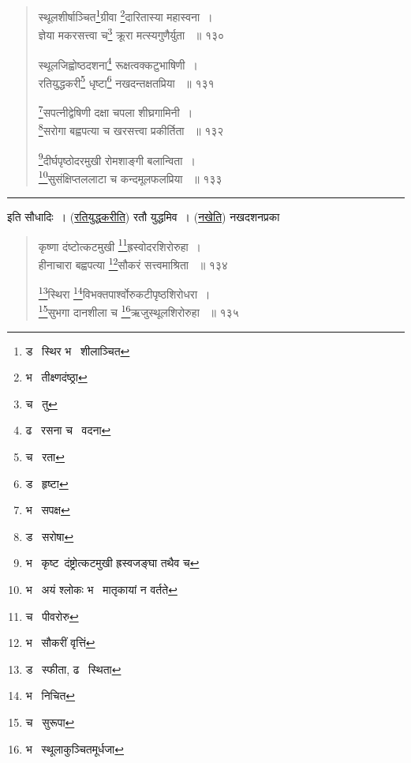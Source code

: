 \documentclass[11pt, openany]{book}
\begin{document}
{\begin{quote}
{स्थूलशीर्षाञ्चित\renewcommand{\thefootnote}{8}\footnote{ड \textendash\ स्थिर भ \textendash\ शीलाञ्चित }ग्रीवा \renewcommand{\thefootnote}{9}\footnote{भ \textendash\ तीक्ष्णदंष्ठ्रा}दारितास्या महास्वना~। \\
ज्ञेया मकरसत्त्वा च\renewcommand{\thefootnote}{10}\footnote{च \textendash\ तु } क्रूरा मत्स्यगुणैर्युता ~॥ १३० 

स्थूलजिह्वोष्ठदशना\renewcommand{\thefootnote}{11}\footnote{ढ \textendash\ रसना च \textendash\ वदना } रूक्षत्वक्कटुभाषिणी~।\\ 
रतियुद्धकरी\renewcommand{\thefootnote}{12}\footnote{च \textendash\ रता } धृष्टा\renewcommand{\thefootnote}{13}\footnote{ड \textendash\ हृष्टा} नखदन्तक्षतप्रिया ~॥ १३१ 

\renewcommand{\thefootnote}{14}\footnote{भ \textendash\ सपक्ष}सपत्नीद्वेषिणी दक्षा चपला शीघ्रगामिनी~।\\ 
\renewcommand{\thefootnote}{15}\footnote{ड \textendash\ सरोषा }सरोगा बह्वपत्या च खरसत्त्वा प्रकीर्तिता ~॥ १३२ 

\renewcommand{\thefootnote}{16}\footnote{भ \textendash\ कृष्ट\textendash\ दंष्ट्रोत्कटमुखी ह्रस्वजङ्घा तथैव च}दीर्घपृष्ठोदरमुखी रोमशाङ्गी बलान्विता~। \\
\renewcommand{\thefootnote}{17}\footnote{भ \textendash\ अयं श्लोकः भ \textendash\ मातृकायां न वर्तते }सुसंक्षिप्तललाटा च कन्दमूलफलप्रिया ~॥ १३३ }
\end{quote}

\hrule

\vspace{2mm}

\noindent
इति सौधादिः~। (\underline{रतियुद्धकरीति}) रतौ युद्धमिव~। (\underline{नखेति}) नखदशनप्रका\textendash\ 

\newpage

\begin{quote}
 {\na कृष्णा दंष्टोत्कटमुखी \renewcommand{\thefootnote}{1}\footnote{च \textendash\ पीवरोरु}ह्रस्वोदरशिरोरुहा~। \\
हीनाचारा बह्वपत्या \renewcommand{\thefootnote}{2}\footnote{भ \textendash\ सौकरीं वृत्तिं}सौकरं सत्त्वमाश्रिता ~॥ १३४ 

\renewcommand{\thefootnote}{3}\footnote{ड \textendash\ स्फीता, ढ \textendash\ स्थिता}स्थिरा \renewcommand{\thefootnote}{4}\footnote{भ \textendash\ निचित }विभक्तपार्श्वोरुकटीपृष्ठशिरोधरा~।\\ 
\renewcommand{\thefootnote}{5}\footnote{च \textendash\ सुरूपा}सुभगा दानशीला च \renewcommand{\thefootnote}{6}\footnote{भ \textendash\ स्थूलाकुञ्चितमूर्धजा}ऋजुस्थूलशिरोरुहा ~॥ १३५ 

}
\end{quote}}
\end{document}
